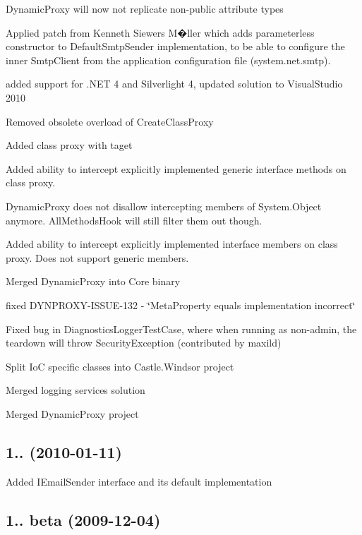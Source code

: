\begin{DoxyItemize}
\item Dynamic\+Proxy will now not replicate non-\/public attribute types
\item Applied patch from Kenneth Siewers M�ller which adds parameterless constructor to Default\+Smtp\+Sender implementation, to be able to configure the inner Smtp\+Client from the application configuration file (system.\+net.\+smtp).
\item added support for .N\+ET 4 and Silverlight 4, updated solution to Visual\+Studio 2010
\item Removed obsolete overload of Create\+Class\+Proxy
\item Added class proxy with taget
\item Added ability to intercept explicitly implemented generic interface methods on class proxy.
\item Dynamic\+Proxy does not disallow intercepting members of System.\+Object anymore. All\+Methods\+Hook will still filter them out though.
\item Added ability to intercept explicitly implemented interface members on class proxy. Does not support generic members.
\item Merged Dynamic\+Proxy into Core binary
\item fixed D\+Y\+N\+P\+R\+O\+X\+Y-\/\+I\+S\+S\+U\+E-\/132 -\/ \char`\"{}\+Meta\+Property equals implementation incorrect\char`\"{}
\item Fixed bug in Diagnostics\+Logger\+Test\+Case, where when running as non-\/admin, the teardown will throw Security\+Exception (contributed by maxild)
\item Split IoC specific classes into Castle.\+Windsor project
\item Merged logging services solution
\item Merged Dynamic\+Proxy project
\end{DoxyItemize}

\subsection*{1.. (2010-\/01-\/11)}


\begin{DoxyItemize}
\item Added I\+Email\+Sender interface and its default implementation
\end{DoxyItemize}

\subsection*{1.. beta (2009-\/12-\/04)}



